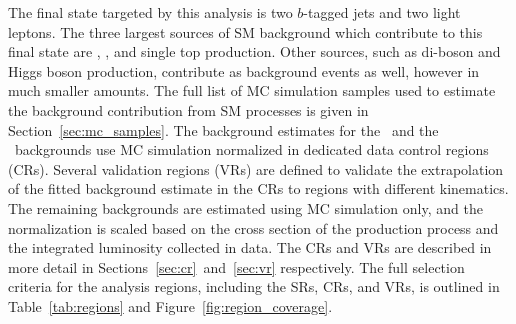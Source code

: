 The final state targeted by this analysis is two $b$-tagged jets and two light
leptons.
The three largest sources of SM background which contribute to this final state
are \TTBAR, \ZGAMMAJETS, and single top production.
Other sources, such as di-boson and Higgs boson production, contribute as
background events as well, however in much smaller amounts.
The full list of MC simulation samples used to estimate the background
contribution from SM processes is given in Section~\ref{sec:mc_samples}.
The background estimates for the \TTBAR\ and the \ZGAMMAJETS\ backgrounds use
MC simulation normalized in dedicated data control regions (CRs).
Several validation regions (VRs) are defined to validate the extrapolation of
the fitted background estimate in the CRs to regions with different kinematics.
The remaining backgrounds are estimated using MC simulation only, and the
normalization is scaled based on the cross section of the production process and
the integrated luminosity collected in data.
The CRs and VRs are described in more detail in
Sections~\ref{sec:cr}~and~\ref{sec:vr} respectively.
The full selection criteria for the analysis regions, including the SRs, CRs,
and VRs, is outlined in Table~\ref{tab:regions} and
Figure~\ref{fig:region_coverage}.

